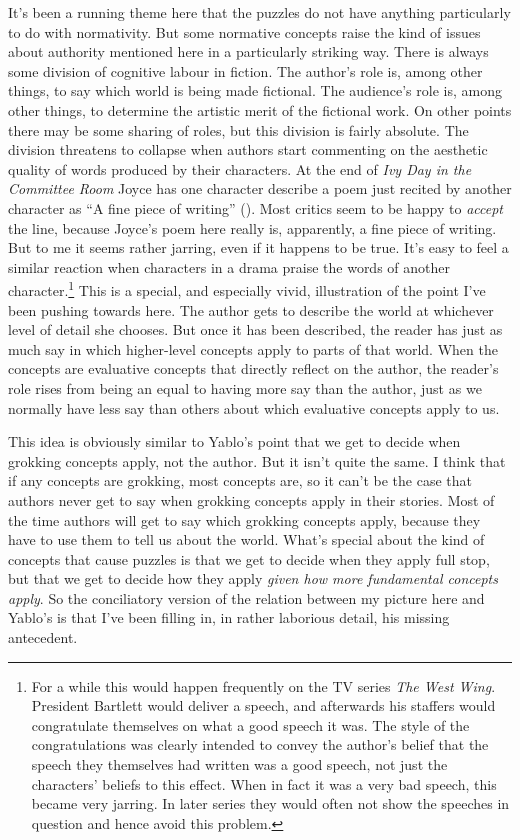 \documentclass[
  10pt,
  letterpaper,
  DIV=11,
  numbers=noendperiod,
  twoside]{scrartcl}
\begin{document}
It's been a running theme here that the puzzles do not have anything
particularly to do with normativity. But some normative concepts raise
the kind of issues about authority mentioned here in a particularly
striking way. There is always some division of cognitive labour in
fiction. The author's role is, among other things, to say which world is
being made fictional. The audience's role is, among other things, to
determine the artistic merit of the fictional work. On other points
there may be some sharing of roles, but this division is fairly
absolute. The division threatens to collapse when authors start
commenting on the aesthetic quality of words produced by their
characters. At the end of \emph{Ivy Day in the Committee Room} Joyce has
one character describe a poem just recited by another character as ``A
fine piece of writing'' (). Most critics seem to be happy to \emph{accept} the line, because
Joyce's poem here really is, apparently, a fine piece of writing. But to
me it seems rather jarring, even if it happens to be true. It's easy to
feel a similar reaction when characters in a drama praise the words of
another character.\footnote{For a while this would happen frequently on
  the TV series \emph{The West Wing}. President Bartlett would deliver a
  speech, and afterwards his staffers would congratulate themselves on
  what a good speech it was. The style of the congratulations was
  clearly intended to convey the author's belief that the speech they
  themselves had written was a good speech, not just the characters'
  beliefs to this effect. When in fact it was a very bad speech, this
  became very jarring. In later series they would often not show the
  speeches in question and hence avoid this problem.} This is a special,
and especially vivid, illustration of the point I've been pushing
towards here. The author gets to describe the world at whichever level
of detail she chooses. But once it has been described, the reader has
just as much say in which higher-level concepts apply to parts of that
world. When the concepts are evaluative concepts that directly reflect
on the author, the reader's role rises from being an equal to having
more say than the author, just as we normally have less say than others
about which evaluative concepts apply to us.

This idea is obviously similar to Yablo's point that we get to decide
when grokking concepts apply, not the author. But it isn't quite the
same. I think that if any concepts are grokking, most concepts are, so
it can't be the case that authors never get to say when grokking
concepts apply in their stories. Most of the time authors will get to
say which grokking concepts apply, because they have to use them to tell
us about the world. What's special about the kind of concepts that cause
puzzles is that we get to decide when they apply full stop, but that we
get to decide how they apply \emph{given how more fundamental concepts
apply}. So the conciliatory version of the relation between my picture
here and Yablo's is that I've been filling in, in rather laborious
detail, his missing antecedent.
\end{document}
